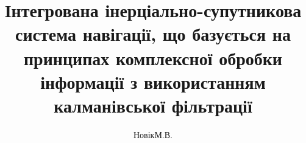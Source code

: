 
\title{\fontsize{12}{12} \selectfont Інтегрована інерціально-супутникова система навігації, що базується на принципах комплексної обробки інформації
з використанням калманівської фільтрації}
\author{НовікМ.В.}

\renewcommand{\ESKDcolumnXfIVname}{Консульт.}










\renewcommand\labelenumi{\arabic{enumi}.} 
\renewcommand\labelenumii{\theenumi.\arabic{enumii}.}
\renewcommand\labelenumiii{\arabic{enumi}.\arabic{enumii}.\arabic{enumiii}.}